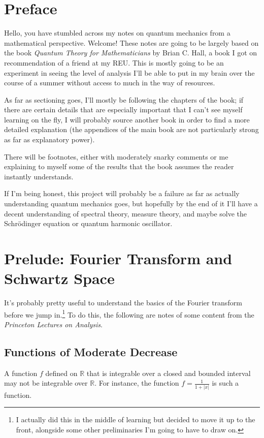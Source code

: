 \documentclass[12pt]{extarticle}
\title{}
\author{}
\date{}
\newcommand{\R}{\mathbb{R}}
\theoremstyle{plain}
\theoremstyle{definition}
\theoremstyle{remark}
\renewcommand{\newline}{\hfill\break}
\begin{document}
\tableofcontents
  \section{Preface}%
  Hello, you have stumbled across my notes on quantum mechanics from a mathematical perspective. Welcome! These notes are going to be largely based on the book \textit{Quantum Theory for Mathematicians} by Brian C. Hall, a book I got on recommendation of a friend at my REU. This is mostly going to be an experiment in seeing the level of analysis I'll be able to put in my brain over the course of a summer without access to much in the way of resources.\newline

  As far as sectioning goes, I'll mostly be following the chapters of the book; if there are certain details that are especially important that I can't see myself learning on the fly, I will probably source another book in order to find a more detailed explanation (the appendices of the main book are not particularly strong as far as explanatory power).\newline

  There will be footnotes, either with moderately snarky comments or me explaining to myself some of the results that the book assumes the reader instantly understands.\newline

  If I'm being honest, this project will probably be a failure as far as actually understanding quantum mechanics goes, but hopefully by the end of it I'll have a decent understanding of spectral theory, measure theory, and maybe solve the Schrödinger equation or quantum harmonic oscillator.
  \section{Prelude: Fourier Transform and Schwartz Space}%
  It's probably pretty useful to understand the basics of the Fourier transform before we jump in.\footnote{I actually did this in the middle of learning but decided to move it up to the front, alongside some other preliminaries I'm going to have to draw on.} To do this, the following are notes of some content from the \textit{Princeton Lectures on Analysis}. 
  \subsection{Functions of Moderate Decrease}%
  A function $f$ defined on $\R$ that is integrable over a closed and bounded interval may not be integrable over $\R$. For instance, the function $f = \frac{1}{1+|x|}$ is such a function.\newline
\end{document}
